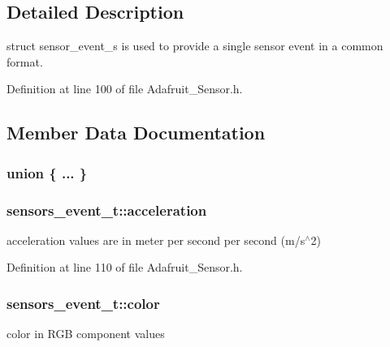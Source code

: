\subsection{Detailed Description}
struct sensor\+\_\+event\+\_\+s is used to provide a single sensor event in a common format. 

Definition at line 100 of file Adafruit\+\_\+\+Sensor.\+h.



\subsection{Member Data Documentation}
\subsubsection[{\texorpdfstring{"@11}{@11}}]{\setlength{\rightskip}{0pt plus 5cm}union \{ ... \} }\hypertarget{structsensors__event__t_a65765f2fda6943ab0fa6ef1d4b9d7d35}{}\label{structsensors__event__t_a65765f2fda6943ab0fa6ef1d4b9d7d35}
\subsubsection[{\texorpdfstring{acceleration}{acceleration}}]{ sensors\+\_\+event\+\_\+t\+::acceleration}\hypertarget{structsensors__event__t_a91a4325f468d3155e6921358a6f61baa}{}\label{structsensors__event__t_a91a4325f468d3155e6921358a6f61baa}
acceleration values are in meter per second per second (m/s$^\wedge$2) 

Definition at line 110 of file Adafruit\+\_\+\+Sensor.\+h.

\subsubsection[{\texorpdfstring{color}{color}}]{ sensors\+\_\+event\+\_\+t\+::color}\hypertarget{structsensors__event__t_a56b4d05fbf47013727ec1a0a94db91e6}{}\label{structsensors__event__t_a56b4d05fbf47013727ec1a0a94db91e6}
color in R\+GB component values 

